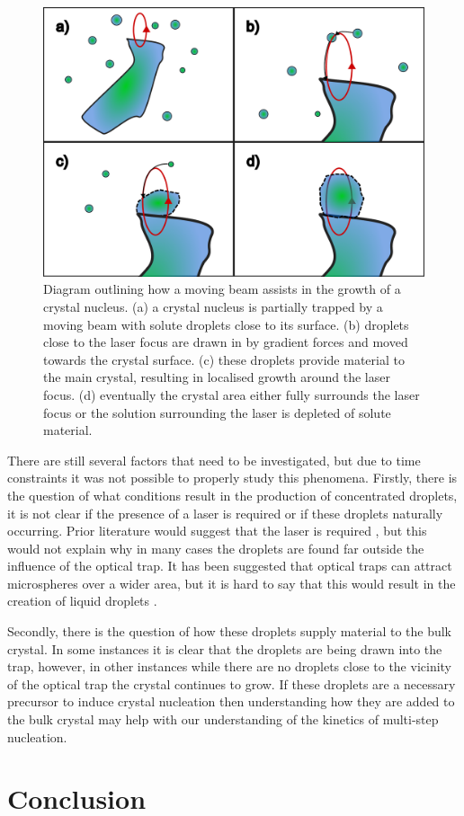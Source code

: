 \begin{figure}[h!]
	\centering
	\includegraphics[width=\linewidth]{galvano_diagram.pdf}
	\caption{Diagram outlining how a moving beam assists in the growth of a crystal
		nucleus. (a) a crystal nucleus is partially trapped by a moving beam with 
		solute droplets close to its surface. (b) droplets close to the laser
		focus are drawn in by gradient forces and moved towards the crystal surface.
		(c) these droplets provide material to the main crystal, resulting in
		localised growth around the laser focus. (d) eventually the crystal area 
		either fully surrounds the laser focus or the solution surrounding the laser
		is depleted of solute material.}
\end{figure}

There are still several factors that need to be investigated, but due to time
constraints it was not possible to properly study this phenomena. Firstly, 
there is the question of what conditions result in the production of concentrated
droplets, it is not clear if the presence of a laser is required or if these
droplets naturally occurring. Prior literature would suggest that the laser is 
required \cite{Liao2022, Tsuboi2009}, but this would not explain why in many 
cases the droplets are found far outside the influence of the optical trap. It
has been suggested that optical traps can attract microspheres over a wider 
area, but it is hard to say that this would result in the creation of liquid 
droplets \cite{Yi2021}.

Secondly, there is the question of how these droplets supply material to the 
bulk crystal. In some instances it is clear that the droplets are being drawn 
into the trap, however, in other instances while there are no droplets close to
the vicinity of the optical trap the crystal continues to grow. If these droplets
are a necessary precursor to induce crystal nucleation then understanding how
they are added to the bulk crystal may help with our understanding of the kinetics
of multi-step nucleation. 

\section{Conclusion}

